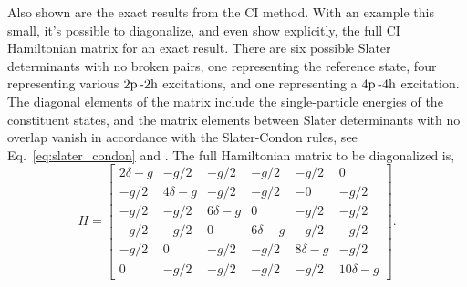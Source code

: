 \documentclass[thesis.tex]{subfiles}
\begin{document}
Also shown are the exact results from the CI method.  With an example this small, it's possible to diagonalize, and even show explicitly, the full CI Hamiltonian matrix for an exact result.  There are six possible Slater determinants with no broken pairs, one representing the reference state, four representing various $2\mathrm{p}\hspace{2pt}\text{-}2\mathrm{h}$ excitations, and one representing a $4\mathrm{p}\hspace{2pt}\text{-}4\mathrm{h}$ excitation.  The diagonal elements of the matrix include the single-particle energies of the constituent states, and the matrix elements between Slater determinants with no overlap vanish in accordance with the Slater-Condon rules, see Eq.\ \eqref{eq:slater_condon} and \cite{SLATER1929,CONDON1930}.  The full Hamiltonian matrix to be diagonalized is,
\begin{equation}
  H = \begin{bmatrix}
    2\delta -g & -g/2 & -g/2 & -g/2 & -g/2 & 0 \\ -g/2 & 4\delta -g &
    -g/2 & -g/2 & -0 & -g/2 \\ -g/2 & -g/2 & 6\delta -g & 0 & -g/2 &
    -g/2 \\ -g/2 & -g/2 & 0 & 6\delta-g & -g/2 & -g/2 \\ -g/2 & 0 & -g/2
    & -g/2 & 8\delta-g & -g/2 \\ 0 & -g/2 & -g/2 & -g/2 & -g/2 &
    10\delta -g
  \end{bmatrix}.
\end{equation}
\end{document}

